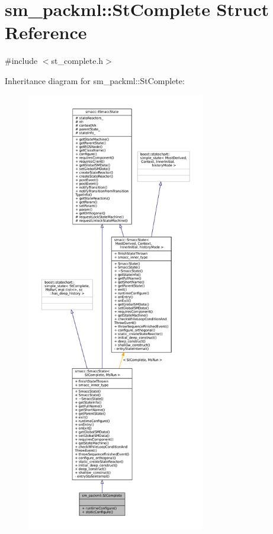 \hypertarget{structsm__packml_1_1StComplete}{}\section{sm\+\_\+packml\+:\+:St\+Complete Struct Reference}
\label{structsm__packml_1_1StComplete}


{\ttfamily \#include $<$st\+\_\+complete.\+h$>$}



Inheritance diagram for sm\+\_\+packml\+:\+:St\+Complete\+:
\nopagebreak
\begin{figure}[H]
\begin{center}
\leavevmode
\includegraphics[height=550pt]{structsm__packml_1_1StComplete__inherit__graph}
\end{center}
\end{figure}


